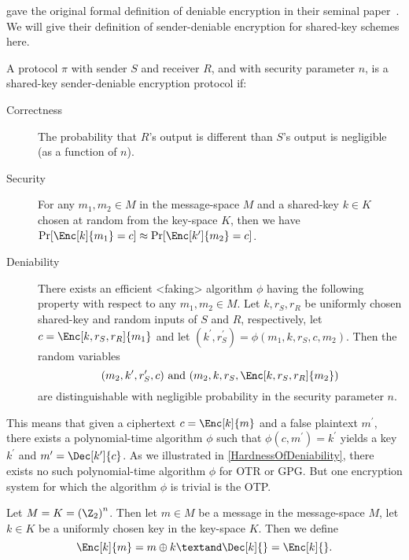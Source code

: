 \citeauthor{DeniableEncryption} gave the original formal definition of deniable 
encryption in their seminal paper~\cite{DeniableEncryption}.
We will give their definition of sender-deniable encryption for shared-key 
schemes here.
\begin{definition}\label{DeniableEnc}
  A protocol \(\pi\) with sender \(S\) and receiver \(R\), and with security 
  parameter \(n\), is a shared-key sender-deniable encryption protocol if:
  \begin{description}
    \item[Correctness] The probability that \(R\)'s output is different than 
      \(S\)'s output is negligible (as a function of \(n\)).

    \item[Security] For any \(m_1, m_2\in M\) in the message-space \(M\) and 
      a shared-key \(k\in K\) chosen at random from the key-space \(K\), then 
      we have \(\Pr[ \Enc[k]{ m_1 } = c ] \approx \Pr[ \Enc[k^\prime]{ m_2 
        } = c ]\).

    \item[Deniability] There exists an efficient <faking> algorithm \(\phi\) 
      having the following property with respect to any \(m_1, m_2\in M\).
      Let \(k, r_S, r_R\) be uniformly chosen shared-key and random inputs of 
      \(S\) and \(R\), respectively, let \(c = \Enc[k, r_S, r_R]{ m_1 }\) and 
      let \((k^\prime, r_S^\prime) = \phi( m_1, k, r_S, c, m_2 )\).
      Then the random variables \[
        ( m_2, k^\prime, r_S^\prime, c ) \text{ and }
        ( m_2, k, r_S, \Enc[k, r_S, r_R]{ m_2 } )
      \] are distinguishable with negligible probability in the security 
      parameter \(n\).
  \end{description}
\end{definition}
This means that given a ciphertext \(c = \Enc[k]{ m }\) and a false plaintext 
\(m^\prime\), there exists a polynomial-time algorithm \(\phi\) such that 
\(\phi( c, m^\prime ) = k^\prime\) yields a key \(k^\prime\) and \(m^\prime 
  = \Dec[k^\prime]{ c }\).
As we illustrated in \cref{HardnessOfDeniability}, there exists no 
such polynomial-time algorithm \(\phi\) for \ac{OTR} or \ac{GPG}.
But one encryption system for which the algorithm \(\phi\) is trivial is the 
\ac{OTP}.

\begin{definition}\label{OTP}
  Let \(M = K = {(\Z_2)}^n\).
  Then let \(m\in M\) be a message in the message-space \(M\), let \(k\in K\) 
  be a uniformly chosen key in the key-space \(K\).
  Then we define \[
    \Enc[k]{ m } = m\oplus k \textand \Dec[k]{} = \Enc[k]{}.
  \]
\end{definition}

